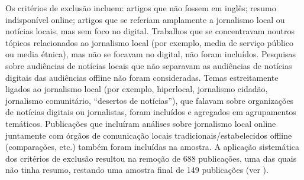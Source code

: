 \documentclass[portuguese]{textolivre}
\begin{document}
Os critérios de exclusão incluem: artigos que não fossem em inglês; resumo indisponível online; artigos que se referiam amplamente a jornalismo local ou notícias locais, mas sem foco no digital. Trabalhos que se concentravam noutros tópicos relacionados ao jornalismo local (por exemplo, media de serviço público ou media étnica), mas não se focavam no digital, não foram incluídos. Pesquisas sobre audiências de notícias locais que não separavam as audiências de notícias digitais das audiências offline não foram consideradas. Temas estreitamente ligados ao jornalismo local (por exemplo, hiperlocal, jornalismo cidadão, jornalismo comunitário, “desertos de notícias”), que falavam sobre organizações de notícias digitais ou jornalistas, foram incluídos e agregados em agrupamentos temáticos. Publicações que incluíram análises sobre jornalismo local online juntamente com órgãos de comunicação locais tradicionais/estabelecidos offline (comparações, etc.) também foram incluídas na amostra. A aplicação sistemática dos critérios de exclusão resultou na remoção de 688 publicações, uma das quais não tinha resumo, restando uma amostra final de 149 publicações (ver ).
\end{document}
